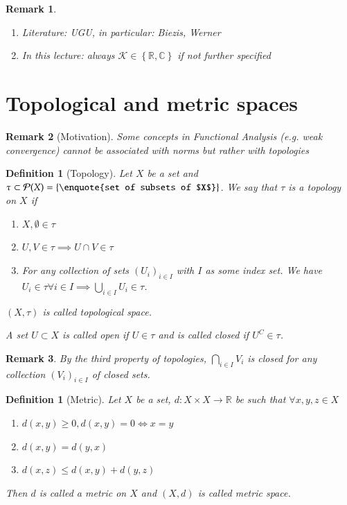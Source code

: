 \documentclass[a4paper]{article}
\newcounter{lecref}[section]
\numberwithin{lecref}{section}
\newtheorem{definition}[lecref]{Definition}
\newtheorem*{Remark}{Remark}
\newcommand{\Set}[1]{\left\{#1\right\}}
\begin{document}
\begin{Remark}
	\begin{enumerate}
		\item Literature: UGU, in particular: Biezis, Werner
		\item In this lecture: always $\mathcal K \in \Set{\mathbb R, \mathbb C}$ if not further specified
	\end{enumerate}
\end{Remark}

\section{Topological and metric spaces}

\begin{Remark}[Motivation]
	Some concepts in Functional Analysis (e.g. weak convergence) cannot be associated with norms but rather with topologies
\end{Remark}

\begin{definition}[Topology]
	\label{definition:1.1}
	Let $X$ be a set and $\tau \subset \mathcal P(X) = \Set{\text{\enquote{set of subsets of $X$}}}$.
	We say that $\tau$ is a \emph{topology} on $X$ if
	\begin{enumerate}
		\item $X, \emptyset \in \tau$
		\item $U, V \in \tau \implies U \cap V \in \tau$
		\item For any collection of sets $(U_i)_{i \in I}$ with $I$ as some index set. We have $U_i \in \tau \forall i \in I \implies \bigcup_{i \in I} U_i \in \tau$.
	\end{enumerate}
	$(X, \tau)$ is called \emph{topological space}.

	A set $U \subset X$ is called \emph{open} if $U \in \tau$ and is called closed if $U^C \in \tau$.
\end{definition}

\begin{Remark}
	By the third property of topologies, $\bigcap_{i \in I} V_i$ is closed for any collection $(V_i)_{i \in I}$ of closed sets.
\end{Remark}

\begin{definition}[Metric]
	\label{definition:1.2}
	Let $X$ be a set, $d: X \times X \to \mathbb R$ be such that $\forall x, y, z \in X$
	\begin{enumerate}
		\item $d(x, y) \geq 0, d(x, y) = 0 \iff x = y$
		\item $d(x, y) = d(y, x)$
		\item $d(x, z) \leq d(x, y) + d(y, z)$
	\end{enumerate}
	Then $d$ is called a \emph{metric on $X$} and $(X, d)$ is called \emph{metric space}.
\end{definition}
\end{document}
